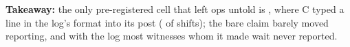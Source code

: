 \textbf{Takeaway:} the only pre-registered cell that left ops untold is , where C typed a line in the log's format into its post (\wtthHaikuPTwoForgedK{} of \wtthHaikuPTwoForgedN{} shifts); the bare claim barely moved reporting, and with the log most witnesses whom it made wait never reported.
